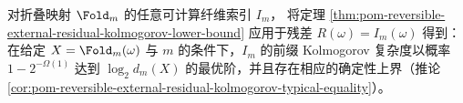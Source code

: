 \begin{remark}\label{rem:xi-godel-rank-index-kolmogorov-incompressible}
对折叠映射 \(\Fold_m\) 的任意可计算纤维索引 \(I_m\)，
将定理 \ref{thm:pom-reversible-external-residual-kolmogorov-lower-bound} 应用于残差 \(R(\omega)=I_m(\omega)\) 得到：
在给定 \(X=\Fold_m(\omega)\) 与 \(m\) 的条件下，\(I_m\) 的前缀 Kolmogorov 复杂度以概率 \(1-2^{-\Omega(1)}\) 达到 \(\log_2 d_m(X)\) 的最优阶，并且存在相应的确定性上界（推论 \ref{cor:pom-reversible-external-residual-kolmogorov-typical-equality}）。
\end{remark}

\endinput
